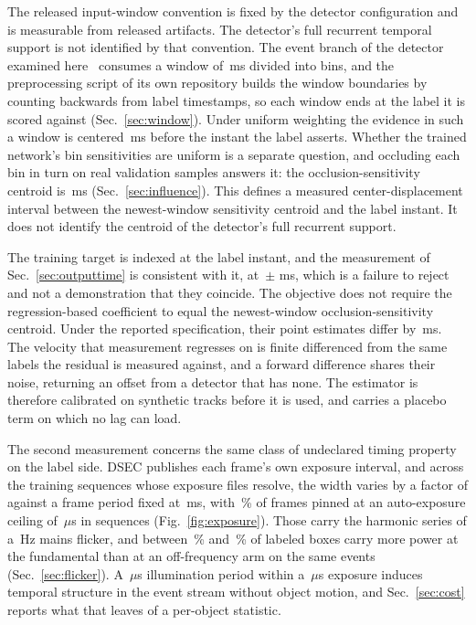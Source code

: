 \documentclass[10pt,twocolumn,letterpaper]{article}
\newcommand{\micro}{\ensuremath{\mu}}
\begin{document}
The released input-window convention is fixed by the detector configuration and is
measurable from released artifacts. The detector's full recurrent temporal support is
not identified by that convention. The event branch of the detector examined
here~\cite{gehrig2023rvt} consumes a window of \rvtWindow\,ms divided into
\rvtBins{} bins, and the preprocessing script of its own repository builds the
window boundaries by counting backwards from label timestamps, so each window
ends at the label it is scored against (Sec.~\ref{sec:window}). Under uniform
weighting the evidence in such a window is centered \rvtCentroidMag\,ms before
the instant the label asserts. Whether the trained network's bin sensitivities
are uniform is a separate question, and occluding each bin in turn on real
validation samples answers it: the occlusion-sensitivity centroid is
\rvtCentroidMeas\,ms (Sec.~\ref{sec:influence}). This defines a measured
center-displacement interval between the newest-window sensitivity centroid and
the label instant. It does not identify the centroid of the detector's full
recurrent support.

The training target is indexed at the label instant, and the
measurement of Sec.~\ref{sec:outputtime} is consistent with it, at
\ladderFullTau\,$\pm$\,\ladderFullTauSE\,ms, which is a failure to reject and not
a demonstration that they coincide. The objective does not require the
regression-based coefficient to equal the newest-window occlusion-sensitivity centroid.
Under the reported specification, their point estimates differ by \outInterval\,ms.
The velocity that measurement regresses on is finite differenced from the same
labels the residual is measured against, and a forward difference shares their
noise, returning an offset from a detector that has none. The estimator is therefore calibrated on synthetic tracks before it is used,
and carries a placebo term on which no lag can load.

The second measurement concerns the same class of undeclared timing property on
the label side. DSEC
publishes each frame's own exposure interval, and across the \dsecSeqCount{}
training sequences whose exposure files resolve, the width varies by a factor of
\dsecExpRatio{} against a frame period fixed at \dsecFramePeriod\,ms, with
\dsecPinnedFrac\,\% of frames pinned at an auto-exposure ceiling of
\dsecExpMax\,\micro s in \dsecCeilingSeqs{} sequences (Fig.~\ref{fig:exposure}).
Those \dsecCeilingSeqs{} carry the harmonic series of a \flickerLineHz\,Hz mains
flicker, and between
\sixLockedLoPct\,\% and \sixLockedHiPct\,\% of labeled boxes carry more power at
the fundamental than at an off-frequency arm on the same events
(Sec.~\ref{sec:flicker}). A \flickerPeriodUs\,\micro s illumination period within a
\dsecExpMax\,\micro s exposure induces temporal structure in the event stream
without object motion, and
Sec.~\ref{sec:cost} reports what that leaves of a per-object statistic.
\end{document}
